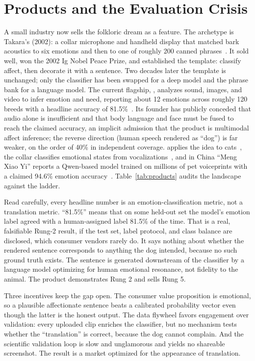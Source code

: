 \section{Products and the Evaluation Crisis}
\label{sec:products}
\label{sec:eval}

A small industry now sells the folkloric dream as a feature. The archetype
is Takara's  (2002): a collar microphone and handheld
display that matched bark acoustics to six emotions and then to one of
roughly 200 canned phrases~\cite{bowlingual2002}. It sold well, won the 2002
Ig Nobel Peace Prize, and established the template: classify affect, then
decorate it with a sentence. Two decades later the template is unchanged;
only the classifier has been swapped for a deep model and the phrase bank
for a language model. The current flagship, , analyzes sound,
images, and video to infer emotion and need, reporting about 12 emotions
across roughly 120 breeds with a headline accuracy of
81.5\%~\cite{traini2024}. Its founder has publicly conceded that audio alone
is insufficient and that body language and face must be fused to reach the
claimed accuracy, an implicit admission that the product is multimodal
affect inference; the reverse direction (human speech rendered as ``dog'')
is far weaker, on the order of 40\% in independent coverage.
 applies the idea to cats~\cite{meowtalk2020}, the
 collar classifies emotional states from
vocalizations~\cite{petpuls2021}, and in China ``Meng Xiao Yi'' reports a
Qwen-based model trained on millions of pet voiceprints with a claimed
94.6\% emotion accuracy~\cite{mengxiaoyi2026}. Table~\ref{tab:products}
audits the landscape against the ladder.

Read carefully, every headline number is an emotion-classification metric,
not a translation metric. ``81.5\%'' means that on some held-out set the
model's emotion label agreed with a human-assigned label 81.5\% of the
time. That is a real, falsifiable Rung-2 result, if the test set, label
protocol, and class balance are disclosed, which consumer vendors rarely
do. It says nothing about whether the rendered sentence corresponds to
anything the dog intended, because no such ground truth exists. The
sentence is generated downstream of the classifier by a language model
optimizing for human emotional resonance, not fidelity to the animal. The
product demonstrates Rung 2 and sells Rung 5.

Three incentives keep the gap open. The consumer value proposition is
emotional, so a plausible affectionate sentence beats a calibrated
probability vector even though the latter is the honest output. The data
flywheel favors engagement over validation: every uploaded clip enriches
the classifier, but no mechanism tests whether the ``translation'' is
correct, because the dog cannot complain. And the scientific validation
loop is slow and unglamorous and yields no shareable screenshot. The result
is a market optimized for the appearance of translation.

